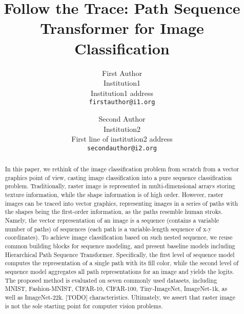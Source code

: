 \documentclass[10pt,twocolumn,letterpaper]{article}
\begin{document}
\title{Follow the Trace: Path Sequence Transformer for Image Classification}

\author{First Author\\
Institution1\\
Institution1 address\\
{\tt\small firstauthor@i1.org}
\and
Second Author\\
Institution2\\
First line of institution2 address\\
{\tt\small secondauthor@i2.org}
}
\maketitle

\begin{abstract}
    In this paper, we rethink of the image classification problem from scratch
    from a vector graphics point of view, casting image classification into a
    pure sequence classification problem.
    Traditionally, raster image is represented in multi-dimensional arrays
    storing texture information, while the shape information is of high order.
    However, raster images can be traced into vector graphics, representing
    images in a series of paths with the shapes being the first-order
    information, as the paths resemble human stroks.
    Namely, the vector representation of an image is a sequence (contains a
    variable number of paths) of sequences (each path is a variable-length
    sequence of x-y coordinates).
    To achieve image classification based on such nested sequence, we reuse
    common building blocks for sequence modeling, and present baseline models
    including Hierarchical Path Sequence Transformer.
    Specifically, the first level of sequence model computes the representation
    of a single path with its fill color, while the second level of sequence
    model aggregates all path representations for an image and yields
    the logits.
    The proposed method is evaluated on seven commonly used datasets, including
    MNIST, Fashion-MNIST, CIFAR-10, CIFAR-100, Tiny-ImageNet, ImageNet-1k,
    as well as ImageNet-22k.
    [TODO] characteristics.
    Ultimately, we assert that raster image is not the sole starting point
    for computer vision problems.
\end{abstract}
\end{document}
